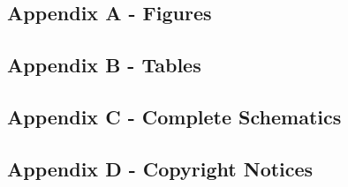 
\subsection{Appendix A - Figures}

\subsection{Appendix B - Tables}

\subsection{Appendix C - Complete Schematics}

\subsection{Appendix D - Copyright Notices}

